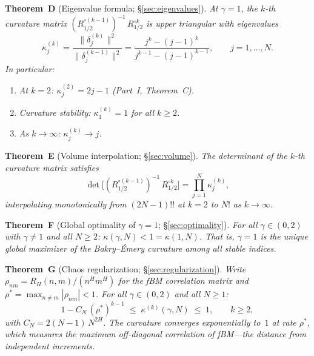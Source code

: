\documentclass[11pt,a4paper]{article}
\theoremstyle{plain}
\theoremstyle{definition}
\theoremstyle{remark}
\begin{document}
\medskip\noindent
\textbf{Theorem~D} (Eigenvalue formula;
\S\ref{sec:eigenvalues}).
\emph{At $\gamma = 1$, the $k$-th curvature matrix
$(R_{1/2}^{\circ(k-1)})^{-1}\,R_{1/2}^{\circ k}$
is upper triangular with eigenvalues
\begin{equation}\label{eq:intro-D}
  \kappa_j^{(k)}
  = \frac{\|\delta_j^{(k)}\|^2}{\|\delta_j^{(k-1)}\|^2}
  = \frac{j^k - (j-1)^k}{j^{k-1} - (j-1)^{k-1}},
  \qquad j = 1,\ldots,N.
\end{equation}
In particular:}
\begin{enumerate}[label=\textup{(\roman*)}]
\item \emph{At $k = 2$:
  $\kappa_j^{(2)} = 2j - 1$
  (Part~I, Theorem~C).}
\item \emph{Curvature stability:
  $\kappa_1^{(k)} = 1$ for all $k \geq 2$.}
\item \emph{As $k \to \infty$:
  $\kappa_j^{(k)} \to j$.}
\end{enumerate}

\medskip\noindent
\textbf{Theorem~E} (Volume interpolation;
\S\ref{sec:volume}).
\emph{The determinant of the $k$-th curvature matrix satisfies
\begin{equation}\label{eq:intro-E}
  \det\bigl[(R_{1/2}^{\circ(k-1)})^{-1}\,R_{1/2}^{\circ k}\bigr]
  = \prod_{j=1}^N \kappa_j^{(k)},
\end{equation}
interpolating monotonically from $(2N{-}1)!!$ at $k = 2$
to $N!$ as $k \to \infty$.}

\medskip\noindent
\textbf{Theorem~F} (Global optimality of $\gamma = 1$;
\S\ref{sec:optimality}).
\emph{For all $\gamma \in (0,2)$ with $\gamma \neq 1$
and all $N \geq 2$:
$\kappa(\gamma,N) < 1 = \kappa(1,N)$.
That is, $\gamma = 1$ is the unique global maximizer
of the Bakry--\'Emery curvature among all stable indices.}

\medskip\noindent
\textbf{Theorem~G} (Chaos regularization;
\S\ref{sec:regularization}).
\emph{Write $\rho_{nm} = R_H(n,m)/(n^H m^H)$ for the
fBM correlation matrix and
$\rho^* = \max_{n \neq m}|\rho_{nm}| < 1$.
For all $\gamma \in (0,2)$ and all $N \geq 1$:
\begin{equation}\label{eq:intro-G}
  1 - C_N\,(\rho^*)^{k-1}
  \;\leq\; \kappa^{(k)}(\gamma,N)
  \;\leq\; 1,
  \qquad k \geq 2,
\end{equation}
with $C_N = 2(N{-}1)\,N^{2H}$.
The curvature converges exponentially to~$1$ at rate
$\rho^*$, which measures the maximum off-diagonal
correlation of fBM---the distance from independent
increments.}
\end{document}
